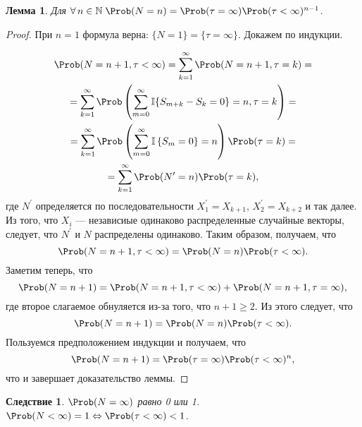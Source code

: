 \documentclass[a4paper]{article}
\newcommand{\ind}{\mathbb I}
\theoremstyle{plain}
\newtheorem{lem}[thm]{Лемма}
\newtheorem*{cor}{Следствие}
\theoremstyle{definition}
\theoremstyle{remark}
\begin{document}
\begin{lem}
  Для  $ \forall\, n \in \mathbb{N} \; \Prob(N = n)  =  \Prob(\tau = \infty)\Prob(\tau < \infty)^{n-1}$.
\end{lem}

\begin{proof}
  При $n = 1$ формула верна: $\lbrace N = 1 \rbrace = \lbrace \tau = \infty \rbrace$. Докажем по индукции.

  \begin{multline*}
    \Prob(N = n+1, \tau < \infty) = \sum_{k=1}^{\infty} \Prob(N = n+1, \tau = k) =\\
    = \sum_{k=1}^{\infty} \Prob\left( \sum_{m=0}^{\infty} \ind \lbrace S_{m+k} - S_{k} = 0 \rbrace = n, \tau = k\right) =\\
    = \sum_{k=1}^{\infty} \Prob\left( \sum_{m=0}^{\infty} \ind \left\lbrace S_{m} = 0 \right\rbrace = n\right)\Prob(\tau = k) =\\
    = \sum_{k=1}^{\infty} \Prob(N^{\prime} = n)\Prob(\tau = k),
  \end{multline*}
  где $N^{\prime}$ определяется по последовательности $X_{1}^{\prime} = X_{k+1}$, $X_{2}^{\prime} = X_{k+2}$ и так далее. Из того, что $X_{i}$ --- независиые одинаково распределенные случайные векторы, следует, что $N^{\prime}$ и $N$ распределены одинаково. Таким образом, получаем, что
  \begin{equation*}
    \Prob(N = n+1, \tau < \infty) = \Prob(N = n)\Prob(\tau < \infty).
  \end{equation*}
  Заметим теперь, что
  \begin{equation*}
    \Prob(N = n+1) = \Prob(N = n+1, \tau < \infty) + \Prob(N = n+1, \tau = \infty),
  \end{equation*}
  где второе слагаемое обнуляется из-за того, что $n+1 \geqslant 2$. Из этого следует, что
  \begin{equation*}
    \Prob(N = n+1) = \Prob(N = n)\Prob(\tau < \infty).
  \end{equation*}
  Пользуемся предположением индукции и получаем, что
  \begin{equation*}
    \Prob(N = n+1) = \Prob(\tau = \infty)\Prob(\tau < \infty)^{n},
  \end{equation*}
  что и завершает доказательство леммы.
\end{proof}

\begin{cor}
  $\Prob(N = \infty)$ равно 0 или 1. $\Prob(N < \infty) = 1 \Leftrightarrow \Prob(\tau < \infty) < 1$.
\end{cor}
\end{document}
